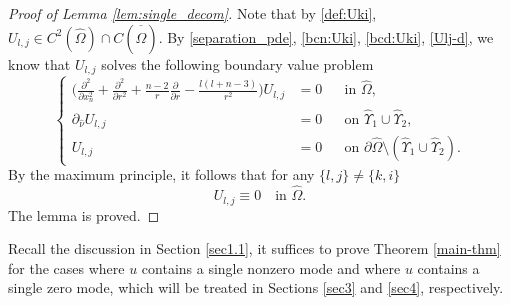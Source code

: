 \documentclass[reqno, 10pt]{amsart}
\theoremstyle{plain}
\theoremstyle{definition}
\theoremstyle{remark}
\numberwithin{equation}{section}
\begin{document}
\begin{proof}[Proof of Lemma \ref{lem:single_decom}]
Note that by \eqref{def:Uki}, $U_{l,j}\in C^2(\hat\Omega)\cap C(\overline{\hat\Omega})$.
By \eqref{separation_pde}, \eqref{bcn:Uki}, \eqref{bcd:Uki}, \eqref{Ulj-d}, we know that $U_{l,j}$ solves the following boundary value problem
$$
\left\{
\begin{aligned}
    \Big(\frac{\partial^2}{\partial x_n^2}+\frac{\partial^2}{\partial r^2}+\frac{n-2}{r}\frac{\partial}{\partial r}-\frac{l(l+n-3)}{r^2}\Big)U_{l,j}&=0 && \mbox{in }\hat{\Omega},\\
     \partial_{\hat\nu} U_{l,j}&=0 &&\mbox{on }\hat\Upsilon_1\cup \hat\Upsilon_2, \\
     U_{l,j}&=0 &&\mbox{on } \partial\hat{\Omega}\setminus(\hat\Upsilon_1\cup \hat\Upsilon_2).
\end{aligned}
\right.
$$
By the maximum principle, it follows that for any $\{l,j\}\neq \{k,i\}$
$$U_{l,j}\equiv 0 \quad \mbox{in } \hat\Omega.$$ 
The lemma is proved.
\end{proof}
Recall the discussion in Section \ref{sec1.1}, it suffices to prove Theorem \ref{main-thm} for the cases where $u$ contains a single nonzero mode and where $u$ contains a single zero mode, which will be treated in Sections \ref{sec3} and \ref{sec4}, respectively.
\end{document}

